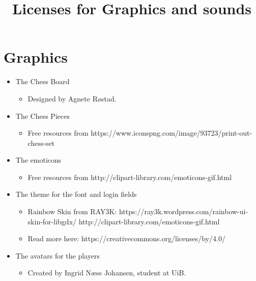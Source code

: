\documentclass{article}
\title{Licenses for Graphics and sounds}
\begin{document}
\date{}
\maketitle
{}

\section*{Graphics}

\begin{itemize}
\item The Chess Board
    \begin{itemize}
        \item Designed by Agnete Røstad.
        \end{itemize}
\end{itemize}

\begin{itemize}
\item The Chess Pieces
    \begin{itemize}
        \item Free resources from https://www.iconspng.com/image/93723/print-out-chess-set
        \end{itemize}
\end{itemize}

\begin{itemize}
\item The emoticons
    \begin{itemize}
        \item Free resources from http://clipart-library.com/emoticons-gif.html
        \end{itemize}
\end{itemize}

\begin{itemize}
\item The theme for the font and login fields
    \begin{itemize}
        \item Rainbow Skin from RAY3K: https://ray3k.wordpress.com/rainbow-ui-skin-for-libgdx/ http://clipart-library.com/emoticons-gif.html
        \item Read more here: https://creativecommons.org/licenses/by/4.0/
        \end{itemize}
\end{itemize}

\begin{itemize}
\item The avatars for the players
    \begin{itemize}
        \item Created by Ingrid Næss Johansen, student at UiB.
        \end{itemize}
\end{itemize}
\end{document}
